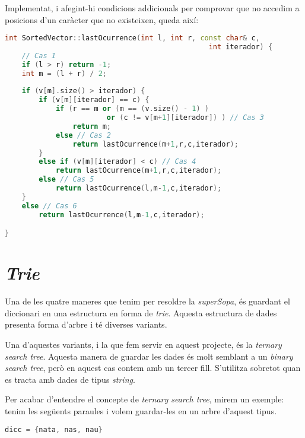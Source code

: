 \documentclass[titlepage]{article}
\begin{document}
Implementat, i afegint-hi condicions addicionals per comprovar que no accedim a posicions d'un caràcter que no existeixen, queda així: \newline
\begin{lstlisting}[language=C++]
int SortedVector::lastOcurrence(int l, int r, const char& c,
                                                int iterador) {
    // Cas 1    
    if (l > r) return -1;
    int m = (l + r) / 2;
   
    if (v[m].size() > iterador) {
        if (v[m][iterador] == c) {
            if (r == m or (m == (v.size() - 1) ) 
                        or (c != v[m+1][iterador]) ) // Cas 3
                return m;
            else // Cas 2
                return lastOcurrence(m+1,r,c,iterador);
        }
        else if (v[m][iterador] < c) // Cas 4
            return lastOcurrence(m+1,r,c,iterador);
        else // Cas 5
            return lastOcurrence(l,m-1,c,iterador);
    }
    else // Cas 6
        return lastOcurrence(l,m-1,c,iterador);   

}
\end{lstlisting}
\clearpage
\section{\textit{Trie}}
Una de les quatre maneres que tenim per resoldre la \textit{superSopa}, és guardant el diccionari en una estructura en forma de \textit{trie}. Aquesta estructura de dades presenta forma d'arbre i té diverses variants. 
\newline\par
Una d'aquestes variants, i la que fem servir en aquest projecte, és la \textit{ternary search tree}. Aquesta manera de guardar les dades és molt semblant a un \textit{binary search tree}, però en aquest cas contem amb un tercer fill. S'utilitza sobretot quan es tracta amb dades de tipus \textit{string}. 
\newline\par
Per acabar d'entendre el concepte de \textit{ternary search tree}, mirem un exemple: tenim les següents paraules i volem guardar-les en un arbre d'aquest tipus.\par
\begin{lstlisting}[language=C++]
    dicc = {nata, nas, nau}
\end{lstlisting}
\end{document}
